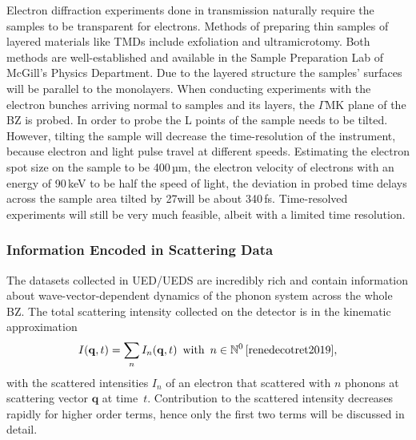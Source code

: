 Electron diffraction experiments done in transmission naturally require the samples to be transparent for electrons.
Methods of preparing thin samples of layered materials like \acp{TMD} include exfoliation\cite{mak2010} and ultramicrotomy\cite{malis1990}.
Both methods are well-established and available in the Sample Preparation Lab of McGill's Physics Department.
Due to the layered structure the samples' surfaces will be parallel to the monolayers.
When conducting experiments with the electron bunches arriving normal to \ts\space samples and its layers, the $\Gamma\mathrm{MK}$ plane of the \ac{BZ} is probed.
In order to probe the L points of \ts\space the sample needs to be tilted.
However, tilting the sample will decrease the time-resolution of the instrument, because electron and light pulse travel at different speeds.
Estimating the electron spot size on the sample to be 400\,µm, the electron velocity of electrons with an energy of 90\,keV to be half the speed of light, the deviation in probed time delays across the sample area tilted by 27\textdegree\space will be about 340\,fs.
Time-resolved experiments will still be very much feasible, albeit with a limited time resolution.

\subsubsection*{Information Encoded in Scattering Data}
The datasets collected in \ac{UED}/\ac{UEDS} are incredibly rich and contain information about wave-vector-dependent dynamics of the phonon system across the whole \ac{BZ}.
The total scattering intensity collected on the detector is in the kinematic approximation
\begin{equation} I(\mathbf{q},t) = \sum_n I_n(\mathbf{q},t)\enspace\text{with}\enspace n \in\mathbb{N}^0\,\label{eq:I}\text{\cite{renedecotret2019}},\end{equation}
with the scattered intensities $I_n$ of an electron that scattered with $n$ phonons at scattering vector $\mathbf{q}$ at time~$t$.
Contribution to the scattered intensity decreases rapidly for higher order terms, hence only the first two terms will be discussed in detail.


